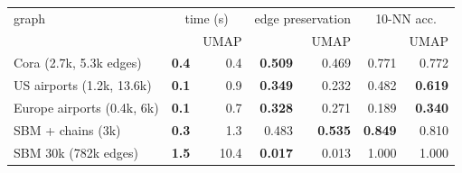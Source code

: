\begin{tabular}{lrrrrrr}
\toprule
graph & \multicolumn{2}{c}{time (s)} & \multicolumn{2}{c}{edge preservation} & \multicolumn{2}{c}{10-NN acc.} \\
 & \magnet{} & UMAP & \magnet{} & UMAP & \magnet{} & UMAP \\
\midrule
Cora (2.7k, 5.3k edges) & \textbf{0.4} & 0.4 & \textbf{0.509} & 0.469 & 0.771 & 0.772 \\
US airports (1.2k, 13.6k) & \textbf{0.1} & 0.9 & \textbf{0.349} & 0.232 & 0.482 & \textbf{0.619} \\
Europe airports (0.4k, 6k) & \textbf{0.1} & 0.7 & \textbf{0.328} & 0.271 & 0.189 & \textbf{0.340} \\
SBM + chains (3k) & \textbf{0.3} & 1.3 & 0.483 & \textbf{0.535} & \textbf{0.849} & 0.810 \\
SBM 30k (782k edges) & \textbf{1.5} & 10.4 & \textbf{0.017} & 0.013 & 1.000 & 1.000 \\
\bottomrule
\end{tabular}
